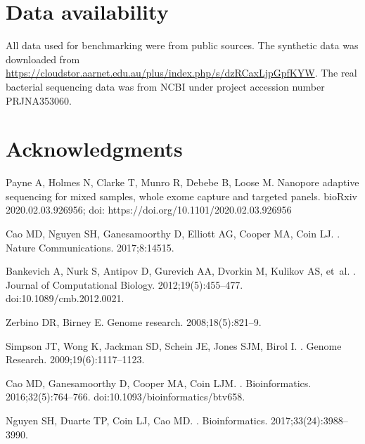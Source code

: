\documentclass[10pt,letterpaper]{article}
\begin{document}
\section*{Data availability}
All data used for benchmarking were from public sources. The synthetic data was downloaded from \url{https://cloudstor.aarnet.edu.au/plus/index.php/s/dzRCaxLjpGpfKYW}. The real bacterial sequencing data was from NCBI under project accession number PRJNA353060.


\section*{Acknowledgments}


\nolinenumbers

\begin{thebibliography}{10}

Payne A, Holmes N, Clarke T, Munro R, Debebe B, Loose M.
\newblock Nanopore adaptive sequencing for mixed samples, whole exome capture and targeted panels.
\newblock bioRxiv 2020.02.03.926956; 
\newblock doi: https://doi.org/10.1101/2020.02.03.926956

Cao MD, Nguyen SH, Ganesamoorthy D, Elliott AG, Cooper MA, Coin LJ.
.
\newblock Nature Communications. 2017;8:14515.

Bankevich A, Nurk S, Antipov D, Gurevich AA, Dvorkin M, Kulikov AS, et~al.
.
\newblock Journal of Computational Biology. 2012;19(5):455--477.
\newblock doi:{10.1089/cmb.2012.0021}.

Zerbino DR, Birney E.
\newblock Genome research. 2008;18(5):821--9.

Simpson JT, Wong K, Jackman SD, Schein JE, Jones SJM, Birol I.
.
\newblock Genome Research. 2009;19(6):1117--1123.

Cao MD, Ganesamoorthy D, Cooper MA, Coin LJM.
.
\newblock Bioinformatics. 2016;32(5):764--766.
\newblock doi:{10.1093/bioinformatics/btv658}.

Nguyen SH, Duarte TP, Coin LJ, Cao MD.
.
\newblock Bioinformatics. 2017;33(24):3988--3990.


\end{thebibliography}
\end{document}
